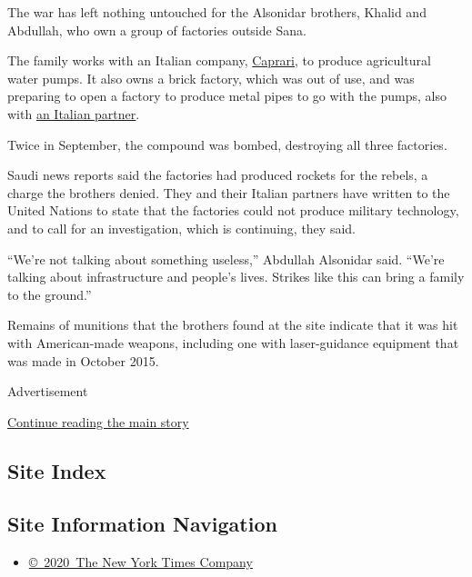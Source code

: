 The war has left nothing untouched for the Alsonidar brothers, Khalid
and Abdullah, who own a group of factories outside Sana.

The family works with an Italian company,
\href{http://www.caprari.com/en/welcome.jsp}{Caprari}, to produce
agricultural water pumps. It also owns a brick factory, which was out of
use, and was preparing to open a factory to produce metal pipes to go
with the pumps, also with \href{http://www.addafer.it/}{an Italian
partner}.

Twice in September, the compound was bombed, destroying all three
factories.

Saudi news reports said the factories had produced rockets for the
rebels, a charge the brothers denied. They and their Italian partners
have written to the United Nations to state that the factories could not
produce military technology, and to call for an investigation, which is
continuing, they said.

``We're not talking about something useless,'' Abdullah Alsonidar said.
``We're talking about infrastructure and people's lives. Strikes like
this can bring a family to the ground.''

Remains of munitions that the brothers found at the site indicate that
it was hit with American-made weapons, including one with laser-guidance
equipment that was made in October 2015.

Advertisement

\protect\hyperlink{after-bottom}{Continue reading the main story}

\hypertarget{site-index}{%
\subsection{Site Index}\label{site-index}}

\hypertarget{site-information-navigation}{%
\subsection{Site Information
Navigation}\label{site-information-navigation}}

\begin{itemize}
\tightlist
\item
  \href{https://help.nytimes.com/hc/en-us/articles/115014792127-Copyright-notice}{©~2020~The
  New York Times Company}
\end{itemize}

